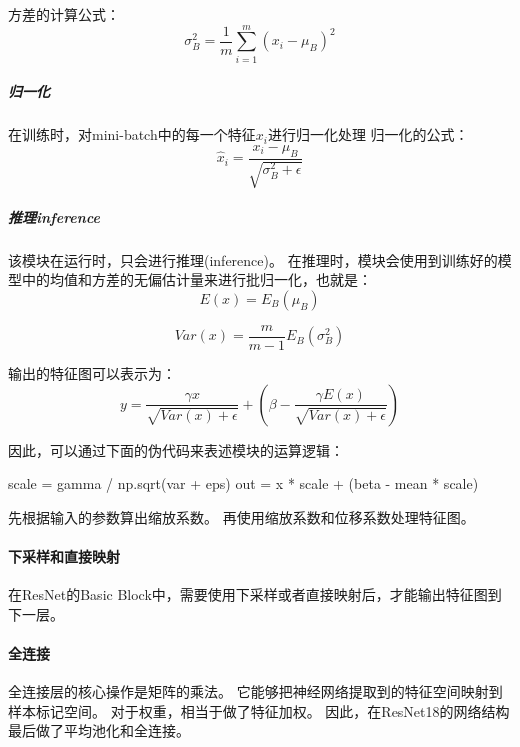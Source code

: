 方差的计算公式：
$$ \sigma_{B}^{2} = \frac{1}{m} \sum_{i=1}^{m}(x_{i} - \mu_{B})^2  $$

\subparagraph{归一化}
在训练时，对mini-batch中的每一个特征$x_i$进行归一化处理
归一化的公式：
$$
        \hat{x}_{i} = \frac{ x_{i} - \mu_{B} }{ \sqrt{\sigma_{B}^{2}+\epsilon}}
$$

\subparagraph{推理inference}
该模块在运行时，只会进行推理(inference)。
在推理时，模块会使用到训练好的模型中的均值和方差的无偏估计量来进行批归一化，也就是：
$$ E(x) = E_{B}(\mu_{B}) $$    

$$ Var(x) = \frac{m}{m-1}E_{B}(\sigma_{B}^{2})  $$    

输出的特征图可以表示为：
$$ y = \frac{\gamma x}{\sqrt{Var(x) + \epsilon}} + ( \beta - \frac{\gamma E(x)}{\sqrt{Var(x) + \epsilon}} )  $$

因此，可以通过下面的伪代码来表述模块的运算逻辑：
\begin{codeblock}[language=python]
    scale = gamma / np.sqrt(var + eps)
    out = x * scale + (beta - mean * scale)
\end{codeblock}
先根据输入的参数算出缩放系数。
再使用缩放系数和位移系数处理特征图。

\paragraph{下采样和直接映射}
在ResNet的Basic Block中，需要使用下采样或者直接映射后，才能输出特征图到下一层。

\paragraph{全连接}
全连接层的核心操作是矩阵的乘法。
它能够把神经网络提取到的特征空间映射到样本标记空间。
对于权重，相当于做了特征加权。
因此，在ResNet18的网络结构最后做了平均池化和全连接。


